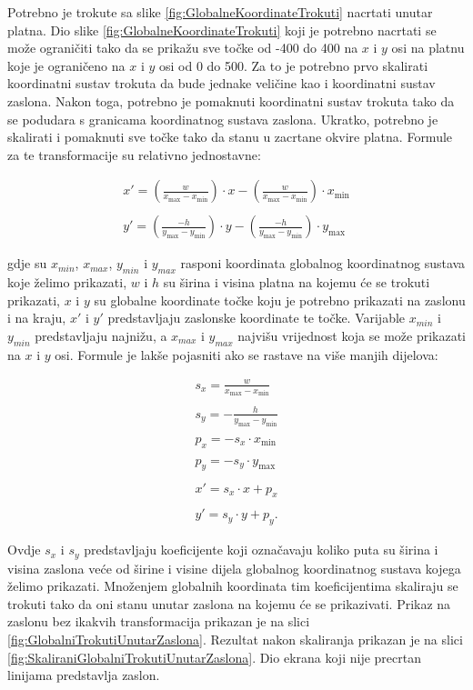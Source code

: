\documentclass{foi}
\begin{document}
Potrebno je trokute sa slike \ref{fig:GlobalneKoordinateTrokuti} nacrtati unutar platna. Dio slike \ref{fig:GlobalneKoordinateTrokuti} koji je potrebno nacrtati se može ograničiti tako da se prikažu sve točke od -400 do 400 na $x$ i $y$ osi na platnu koje je ograničeno na $x$ i $y$ osi od 0 do 500. Za to je potrebno prvo skalirati koordinatni sustav trokuta da bude jednake veličine kao i koordinatni sustav zaslona. Nakon toga, potrebno je pomaknuti koordinatni sustav trokuta tako da se podudara s granicama koordinatnog sustava zaslona. Ukratko, potrebno je skalirati i pomaknuti sve točke tako da stanu u zacrtane okvire platna. Formule za te transformacije su relativno jednostavne:

\begin{align*}
x' = \left(\frac{w}{x_{\max} - x_{\min}}\right) \cdot x - \left(\frac{w}{x_{\max} - x_{\min}}\right) \cdot x_{\min}
\\
\\
y' = \left(\frac{-h}{y_{\max} - y_{\min}}\right) \cdot y - \left(\frac{-h}{y_{\max} - y_{\min}}\right) \cdot y_{\max}
\end{align*}

 gdje su $x_{min}$, $x_{max}$, $y_{min}$ i $y_{max}$  rasponi koordinata globalnog koordinatnog sustava koje želimo prikazati, $w$ i $h$ su širina i visina platna na kojemu će se trokuti prikazati, $x$ i $y$ su globalne koordinate točke koju je potrebno prikazati na zaslonu i na kraju, $x'$ i $y'$ predstavljaju zaslonske koordinate te točke. Varijable $x_{min}$ i $y_{min}$ predstavljaju najnižu, a $x_{max}$ i $y_{max}$ najvišu vrijednost koja se može prikazati na $x$ i $y$ osi. Formule je lakše pojasniti ako se rastave na više manjih dijelova:

\begin{align*}
s_x = \frac{w}{x_{\max} - x_{\min}}
\\
\\
s_y = -\frac{h}{y_{\max} - y_{\min}}
\\
\\
p_x = -s_x \cdot x_{\min}
\\
\\
p_y = -s_y \cdot y_{\max}
\\
\\
x' = s_x \cdot x + p_x
\\
\\
y' = s_y \cdot y + p_y.
\end{align*}

Ovdje $s_x$ i $s_y$ predstavljaju koeficijente koji označavaju koliko puta su širina i visina zaslona veće od širine i visine dijela globalnog koordinatnog sustava kojega želimo prikazati. Množenjem globalnih koordinata tim koeficijentima skaliraju se trokuti tako da oni stanu unutar zaslona na kojemu će se prikazivati. Prikaz na zaslonu  bez ikakvih transformacija prikazan je na slici \ref{fig:GlobalniTrokutiUnutarZaslona}. Rezultat nakon skaliranja prikazan je na slici \ref{fig:SkaliraniGlobalniTrokutiUnutarZaslona}. Dio ekrana koji nije precrtan linijama predstavlja zaslon.
\end{document}
